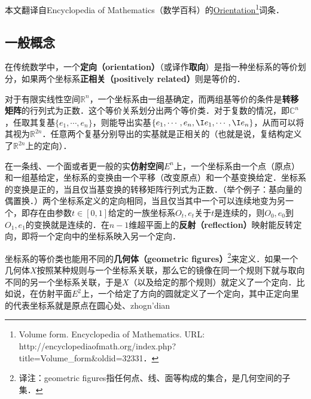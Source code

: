 
本文翻译自Encyclopedia of Mathematics（数学百科）的\href{https://encyclopediaofmath.org/wiki/Volume_form}{Orientation}\footnote{Volume form. Encyclopedia of Mathematics. URL: http://encyclopediaofmath.org/index.php?title=Volume_form&oldid=32331．}词条．

\subsection{一般概念}

在传统数学中，一个\textbf{定向（orientation）}（或译作\textbf{取向}）是指一种坐标系的等价划分，如果两个坐标系\textbf{正相关（positively related）}则是等价的．

对于有限实线性空间$\mathbb{R}^n$，一个坐标系由一组基确定，而两组基等价的条件是\textbf{转移矩阵}的行列式为正数．这个等价关系划分出两个等价类．对于复数的情况，即$\mathbb{C}^n$，任取其复基$\{e_1, \cdots, e_n\}$，则能导出实基$\{e_1, \cdots, e_n, \I e_1, \cdots, \I e_n\}$，从而可以将其视为$\mathbb{R}^{2n}$．任意两个复基分别导出的实基就是正相关的（也就是说，复结构定义了$\mathbb{R}^{2n}$上的定向）．

在一条线、一个面或者更一般的实\textbf{仿射空间}$E^n$上，一个坐标系由一个点（原点）和一组基给定，坐标系的变换由一个平移（改变原点）和一个基变换给定．坐标系的变换是正的，当且仅当基变换的转移矩阵行列式为正数．（举个例子：基向量的偶置换．）两个坐标系定义的定向相同，当且仅当其中一个可以连续地变为另一个，即存在由参数$t\in[0, 1]$给定的一族坐标系$O_t, e_t$关于$t$是连续的，则$O_0, e_0$到$O_1, e_1$的变换就是连续的．在$n-1$维超平面上的\textbf{反射（reflection）}映射能反转定向，即将一个定向中的坐标系映入另一个定向．

坐标系的等价类也能用不同的\textbf{几何体（geometric figures）}\footnote{译注：geometric figures指任何点、线、面等构成的集合，是几何空间的子集．}来定义．如果一个几何体$X$按照某种规则与一个坐标系关联，那么它的镜像在同一个规则下就与取向不同的另一个坐标系关联，于是$X$（以及给定的那个规则）就定义了一个定向．比如说，在仿射平面$E^2$上，一个给定了方向的圆就定义了一个定向，其中正定向里的代表坐标系就是原点在圆心处、zhogn'dian



















